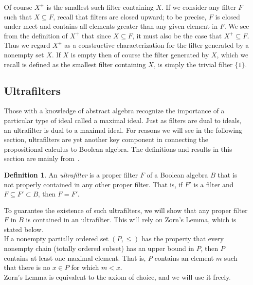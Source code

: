 \documentclass[11pt,titlepage]{article}
\theoremstyle{definition}
\newtheorem{definition}{Definition}[subsection]
\begin{document}
Of course $X^+$ is the smallest such filter containing $X$. If we consider any filter $F$ such that $X\subseteq F$, recall that filters are closed upward; to be precise, $F$ is closed under meet and contains all elements greater than any given element in $F$. We see from the definition of $X^+$ that since $X\subseteq F$, it must also be the case that $X^+\subseteq F$. Thus we regard $X^+$ as a constructive characterization for the filter generated by a nonempty set $X$. If $X$ is empty then of course the filter generated by $X$, which we recall is defined as the smallest filter containing $X$, is simply the trivial filter $\{1\}$.

\subsection{Ultrafilters}

Those with a knowledge of abstract algebra recognize the importance of a particular type of ideal called a maximal ideal. Just as filters are dual to ideals, an ultrafilter is dual to a maximal ideal. For reasons we will see in the following section, ultrafilters are yet another key component in connecting the propositional calculus to Boolean algebra. The definitions and results in this section are mainly from~\cite{Bell}.

\begin{definition}\label{def_uf} An {\em ultrafilter} is a proper filter $F$ of a Boolean algebra $B$ that is not properly contained in any other proper filter. That is, if $F'$ is a filter and $F\subseteq F'\subset B$, then $F=F'$.\end{definition}

To guarantee the existence of such ultrafilters, we will show that any proper filter $F$ in $B$ is contained in an ultrafilter. This will rely on Zorn's Lemma, which is stated below.\\

 If a nonempty partially ordered set $(P,\leq)$ has the property that every nonempty chain (totally ordered subset) has an upper bound in $P$, then $P$ contains at least one maximal element. That is, $P$ contains an element $m$ such that there is no $x\in P$ for which $m<x$.\\

Zorn's Lemma is equivalent to the axiom of choice, and we will use it freely.
\end{document}
